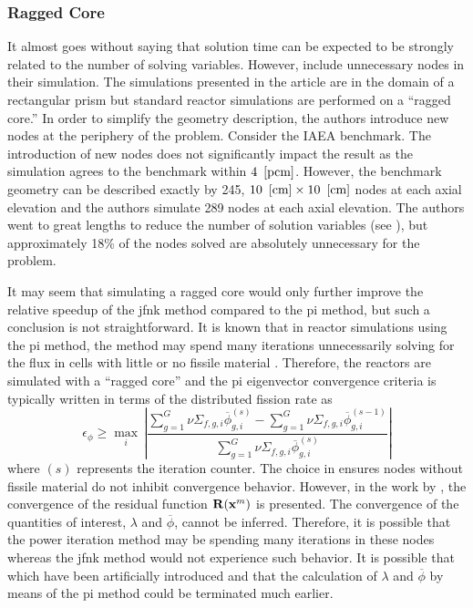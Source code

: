     \subsubsection{Ragged Core}
      It almost goes without saying that solution time can be expected to be
      strongly related to the number of solving variables. However,
      \citeauthor{qe2paper} include unnecessary nodes in their simulation. The
      simulations presented in the article are in the domain of a rectangular
      prism but standard reactor simulations are performed on a ``ragged core.''
      In order to simplify the geometry description, the authors introduce new
      nodes at the periphery of the problem. Consider the IAEA benchmark. The
      introduction of new nodes does not significantly impact the result as the
      simulation agrees to the benchmark within $4~\left[\text{{pcm}}\right]$. However, the
      benchmark geometry can be described exactly by 245, $10~\left[\text{{cm}}\right] \times
      10~\left[\text{{cm}}\right]$ nodes at each axial elevation and the authors simulate 289
      nodes at each axial elevation. The authors went to great lengths to reduce
      the number of solution variables (see ), but
      approximately 18\% of the nodes solved are absolutely unnecessary for the
      problem.

      It may seem that simulating a ragged core would only further improve the
      relative speedup of the \gls{jfnk} method compared to the \gls{pi}
      method, but such a conclusion is not straightforward. It is known that in
      reactor simulations using the \gls{pi} method, the method may spend many 
      iterations unnecessarily solving for the flux in cells with little or no 
      fissile material \cite{gehinThesis}. Therefore, the reactors are simulated 
      with a ``ragged core'' and the \gls{pi} eigenvector convergence criteria 
      is typically written in terms of the distributed fission rate as
      \begin{equation}
        \label{eq:power_iteration_convergence}
        \epsilon_{\phi} \ge \max_{i} \, \left\lvert 
          \frac{\sum_{g=1}^{G} \nu\Sigma_{f,g,i} \overline{\phi}_{g,i}^{(s)} - 
          \sum_{g=1}^{G} \nu\Sigma_{f,g,i} \overline{\phi}_{g,i}^{(s-1)}}
          {\sum_{g=1}^{G} \nu\Sigma_{f,g,i} \overline{\phi}_{g,i}^{(s)}}
          \right\rvert
      \end{equation}
      where $(s)$ represents the iteration counter. The choice in
       ensures nodes without fissile
      material do not inhibit convergence behavior. However, in the work by
      \citeauthor{qe2paper}, the convergence of the residual function
      $\mathbf{R}(\mathbf{x}^m)$ is presented. The convergence of the quantities of
      interest, $\lambda$ and $\overline{\phi}$, cannot be inferred. Therefore,
      it is possible that the power iteration method may be spending many
      iterations in these nodes whereas the \gls{jfnk} method would not
      experience such behavior. It is possible that which have been
      artificially introduced and that the calculation of $\lambda$ and
      $\overline{\phi}$ by means of the \gls{pi} method could be terminated much
      earlier.


